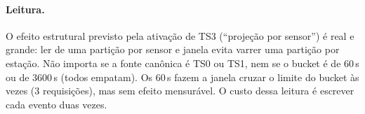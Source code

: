 \paragraph{Leitura.} O efeito estrutural previsto pela ativação de TS3 (``projeção por sensor'') é real e grande: ler de uma partição por sensor e janela evita varrer uma partição por estação. Não importa se a fonte canônica é TS0 ou TS1, nem se o bucket é de 60\,s ou de 3600\,s (todos empatam). Os 60\,s fazem a janela cruzar o limite do bucket às vezes (3 requisições), mas sem efeito mensurável. O custo dessa leitura é escrever cada evento duas vezes.
